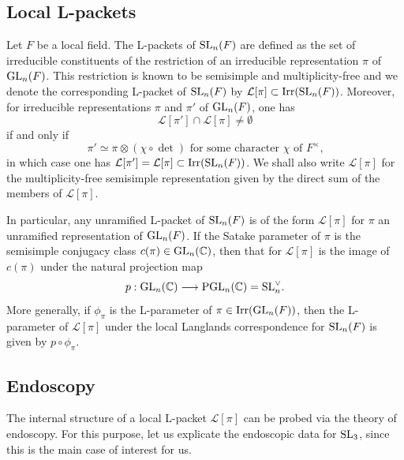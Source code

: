 \documentclass[11pt]{amsart}
\theoremstyle{plain}
\numberwithin{equation}{section}
\newcommand{\C}{\mathbb C}
\def\SL{{\rm SL}}
\def\GL{{\rm GL}}
\def\PGL{{\rm PGL}}
\def\C{{\bf C}}
\def\C{{\mathbb C}}
\begin{document}
\subsection{\bf Local L-packets} \label{SS:Lpackets}
Let $F$ be a local field. The L-packets of $\SL_n(F)$ are defined as the set of irreducible constituents of the restriction of an irreducible representation $\pi$ of $\GL_n(F)$. 
This restriction is known to be semisimple and multiplicity-free \cite{GK} and we denote the corresponding L-packet of $\SL_n(F)$ by $\mathcal{L}[ \pi] \subset {\rm Irr}(\SL_n(F))$. 
 Moreover,   for irreducible representations $\pi$ and $\pi'$ of $\GL_n(F)$, one has 
 \[  \mathcal{L}[\pi'] \cap  \mathcal{L}[\pi]  \ne \emptyset \]
 if and only if 
\[    \text{$\pi' \simeq  \pi \otimes (\chi \circ \det)$ for some character $\chi$ of $F^{\times}$,} \]
in which case one has $\mathcal{L}[\pi'] = \mathcal{L}[\pi] \subset {\rm Irr}(\SL_n(F))$. We shall also write $\mathcal{L}[\pi]$ for the multiplicity-free semisimple representation given by the direct sum of the members of $\mathcal{L}[\pi]$.
 \vskip 5pt
 
 
 
\vskip 5pt

 
In particular,  any unramified L-packet of $\SL_n(F)$ is of the form $\mathcal{L}[\pi]$ for $\pi$ an unramified representation of $\GL_n(F)$.  If the Satake parameter of $\pi$ is the semisimple conjugacy class $c(\pi) \in \GL_n(\C)$, then that for $\mathcal{L}[\pi]$ is the image of $c(\pi)$ under the natural  projection map
\[  p: \GL_n(\C) \longrightarrow \PGL_n(\C) = \SL_n^{\vee}. \]
More generally,  if $\phi_{\pi}$ is the L-parameter of $\pi \in {\rm Irr}(\GL_n(F))$, then the L-parameter of $\mathcal{L}[\pi]$ under  the local Langlands correspondence for $\SL_n(F)$ is given by $p \circ \phi_{\pi}$. 
\vskip 5pt

\subsection{\bf Endoscopy}
The internal structure of a local  L-packet $\mathcal{L}[\pi]$ can be probed via the theory of endoscopy. For this purpose, let us explicate the endoscopic data for $\SL_3$, since this is the main case of interest for us. 
\vskip 5pt
\end{document}

